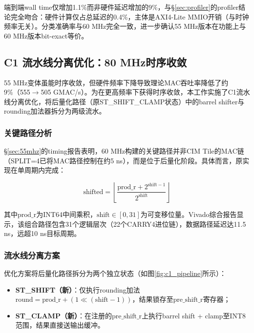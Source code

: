 \documentclass[12pt, a4paper]{article}
\begin{document}
端到端wall time仅增加1.1\%而非硬件延迟增加的9\%，与§\ref{sec:profiler}的profiler结论完全吻合：硬件计算仅占总延迟的0.4\%，主体是AXI4-Lite MMIO开销（与时钟频率无关）。分类准确率与60 MHz完全一致，进一步确认55 MHz版本在功能上与60 MHz版本bit-exact等价。

\subsection{C1 流水线分离优化：80 MHz时序收敛}
\label{sec:c1_pipeline}

55 MHz变体虽能时序收敛，但硬件频率下降导致理论MAC吞吐率降低了约9\%（555$\to$505 GMAC/s）。为在更高频率下获得时序收敛，本工作实施了C1流水线分离优化，将后量化路径（原ST\_SHIFT\_CLAMP状态）中的barrel shifter与rounding加法器拆分为两级流水。

\subsubsection{关键路径分析}

§\ref{sec:55mhz}的timing报告表明，60 MHz构建的关键路径并非CIM Tile的MAC链（SPLIT=4已将MAC路径控制在约5 ns），而是位于后量化阶段。具体而言，原实现在单周期内完成：

\begin{equation}
    \text{shifted} = \left\lfloor \frac{\text{prod\_r} + 2^{\text{shift}-1}}{2^{\text{shift}}} \right\rfloor
\end{equation}

其中$\text{prod\_r}$为INT64中间乘积，$\text{shift}\in[0,31]$为可变移位量。Vivado综合报告显示，该组合路径包含31个逻辑层次（22个CARRY4进位链），数据路径延迟达11.5 ns，远超10 ns目标周期。

\subsubsection{流水线分离方案}

优化方案将后量化路径拆分为两个独立状态（如图\ref{fig:c1_pipeline}所示）：

\begin{itemize}
    \item \textbf{ST\_SHIFT（新）}：仅执行rounding加法 $\text{round} = \text{prod\_r} + (1 \ll (\text{shift} - 1))$，结果锁存至$\text{pre\_shift\_r}$寄存器；
    \item \textbf{ST\_CLAMP（新）}：在注册的$\text{pre\_shift\_r}$上执行barrel shift + clamp至INT8范围，结果直接送输出缓冲。
\end{itemize}
\end{document}
